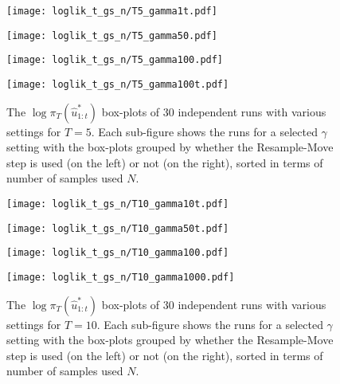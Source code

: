 \begin{figure}[!thbp]
    \centering
    \begin{minipage}{.5\textwidth}
        \centering
        \texttt{[image: loglik\_t\_gs\_n/T5\_gamma1t.pdf]}
    \end{minipage}%
    \begin{minipage}{0.5\textwidth}
        \centering
        \texttt{[image: loglik\_t\_gs\_n/T5\_gamma50.pdf]}
    \end{minipage}
    \begin{minipage}{0.5\textwidth}
        \centering
        \texttt{[image: loglik\_t\_gs\_n/T5\_gamma100.pdf]}
    \end{minipage}%
    \begin{minipage}{0.5\textwidth}
        \centering
        \texttt{[image: loglik\_t\_gs\_n/T5\_gamma100t.pdf]}
    \end{minipage}
    \caption{The $\log\pi_T(\hat{u}^*_{1:t})$ box-plots of 30 independent runs with various settings for $T=5$. Each sub-figure shows the runs for a selected $\gamma$ setting with the box-plots grouped by whether the Resample-Move step is used (on the left) or not (on the right), sorted in terms of number of samples used $N$.}
    \label{fig:rm1}
\end{figure}

\begin{figure}[!thbp]
    \centering
    \begin{minipage}{0.5\textwidth}
        \centering
        \texttt{[image: loglik\_t\_gs\_n/T10\_gamma10t.pdf]}
    \end{minipage}%
    \begin{minipage}{0.5\textwidth}
        \centering
        \texttt{[image: loglik\_t\_gs\_n/T10\_gamma50t.pdf]}
    \end{minipage}
    \begin{minipage}{0.5\textwidth}
        \centering
        \texttt{[image: loglik\_t\_gs\_n/T10\_gamma100.pdf]}
    \end{minipage}%
    \begin{minipage}{0.5\textwidth}
        \centering
        \texttt{[image: loglik\_t\_gs\_n/T10\_gamma1000.pdf]}
    \end{minipage}
    \caption{The $\log\pi_T(\hat{u}^*_{1:t})$ box-plots of 30 independent runs with various settings for $T=10$. Each sub-figure shows the runs for a selected $\gamma$ setting with the box-plots grouped by whether the Resample-Move step is used (on the left) or not (on the right), sorted in terms of number of samples used $N$.}
    \label{fig:rm2}
\end{figure}

